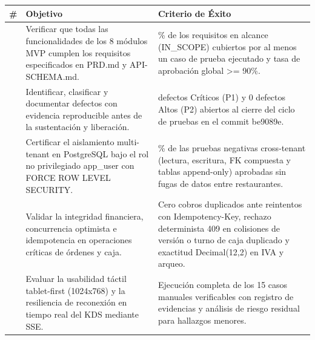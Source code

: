 \documentclass[10pt,a4paper]{article}
\newcounter{none}
\begin{document}
{\def\LTcaptype{none} %
\begin{longtable}[]{@{}
  >{\raggedright\arraybackslash}p{}
  >{\raggedright\arraybackslash}p{}
  >{\raggedright\arraybackslash}p{}@{}}
\toprule\noalign{}
\begin{minipage}[b]{\linewidth}\raggedright
\#
\end{minipage} & \begin{minipage}[b]{\linewidth}\raggedright
Objetivo
\end{minipage} & \begin{minipage}[b]{\linewidth}\raggedright
Criterio de Éxito
\end{minipage} \\
\midrule\noalign{}
\endhead
\bottomrule\noalign{}
\endlastfoot
1 & Verificar que todas las funcionalidades de los 8 módulos MVP cumplen los requisitos especificados en PRD.md y API-SCHEMA.md. & 100\% de los requisitos en alcance (IN\_SCOPE) cubiertos por al menos un caso de prueba ejecutado y tasa de aprobación global \textgreater= 90\%. \\
2 & Identificar, clasificar y documentar defectos con evidencia reproducible antes de la sustentación y liberación. & 0 defectos Críticos (P1) y 0 defectos Altos (P2) abiertos al cierre del ciclo de pruebas en el commit be9089e. \\
3 & Certificar el aislamiento multi-tenant en PostgreSQL bajo el rol no privilegiado app\_user con FORCE ROW LEVEL SECURITY. & 100\% de las pruebas negativas cross-tenant (lectura, escritura, FK compuesta y tablas append-only) aprobadas sin fugas de datos entre restaurantes. \\
4 & Validar la integridad financiera, concurrencia optimista e idempotencia en operaciones críticas de órdenes y caja. & Cero cobros duplicados ante reintentos con Idempotency-Key, rechazo determinista 409 en colisiones de versión o turno de caja duplicado y exactitud Decimal(12,2) en IVA y arqueo. \\
5 & Evaluar la usabilidad táctil tablet-first (1024x768) y la resiliencia de reconexión en tiempo real del KDS mediante SSE. & Ejecución completa de los 15 casos manuales verificables con registro de evidencias y análisis de riesgo residual para hallazgos menores. \\
\end{longtable}
}

\endgroup\medskip
\end{document}
